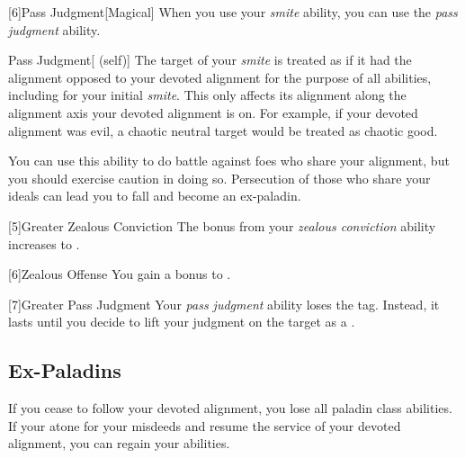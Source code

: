         [6]{Pass Judgment}[Magical] When you use your \textit{smite} ability, you can use the \textit{pass judgment} ability.
        \begin{attuneability}{Pass Judgment}[ (self)]
            The target of your \textit{smite} is treated as if it had the alignment opposed to your devoted alignment for the purpose of all abilities, including for your initial \textit{smite}.
            This only affects its alignment along the alignment axis your devoted alignment is on.
            For example, if your devoted alignment was evil, a chaotic neutral target would be treated as chaotic good.

            You can use this ability to do battle against foes who share your alignment, but you should exercise caution in doing so.
            Persecution of those who share your ideals can lead you to fall and become an ex-paladin.
        \end{attuneability}

        [5]{Greater Zealous Conviction} The bonus from your \textit{zealous conviction} ability increases to .

        [6]{Zealous Offense} You gain a  bonus to .

        [7]{Greater Pass Judgment} Your \textit{pass judgment} ability loses the  tag.
        Instead, it lasts until you decide to lift your judgment on the target as a .


    \subsection{Ex-Paladins}
        If you cease to follow your devoted alignment, you lose all  paladin class abilities.
        If your atone for your misdeeds and resume the service of your devoted alignment, you can regain your abilities.

